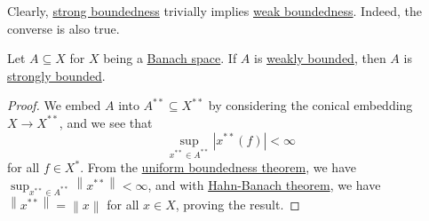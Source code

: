 Clearly, \hyperref[def:strongly-bounded]{strong boundedness} trivially implies \hyperref[def:weakly-bounded]{weak boundedness}. Indeed, the converse is also true.

\begin{corollary}\label{col:weak-bd-implies-strong-bd}
	Let \(A \subseteq X\) for \(X\) being a \hyperref[def:Banach-space]{Banach space}. If \(A\) is \hyperref[def:weakly-bounded]{weakly bounded}, then \(A\) is \hyperref[def:strongly-bounded]{strongly bounded}.
\end{corollary}
\begin{proof}
	We embed \(A\) into \(A^{\ast\ast} \subseteq X^{\ast\ast} \) by considering the conical embedding \(X\to X^{\ast\ast}\), and we see that
	\[
		\sup _{x^{\ast\ast}\in A^{\ast\ast}} \left\vert x^{\ast\ast} (f) \right\vert < \infty
	\]
	for all \(f\in X^{\ast} \). From the \hyperref[thm:uniform-boundedness]{uniform boundedness theorem}, we have \(\sup _{x^{\ast\ast} \in A^{\ast\ast} }\left\lVert x^{\ast\ast} \right\rVert < \infty \), and with \hyperref[thm:Hahn-Banach]{Hahn-Banach theorem}, we have \(\left\lVert x^{\ast\ast} \right\rVert = \left\lVert x\right\rVert \) for all \(x\in X\), proving the result.
\end{proof}